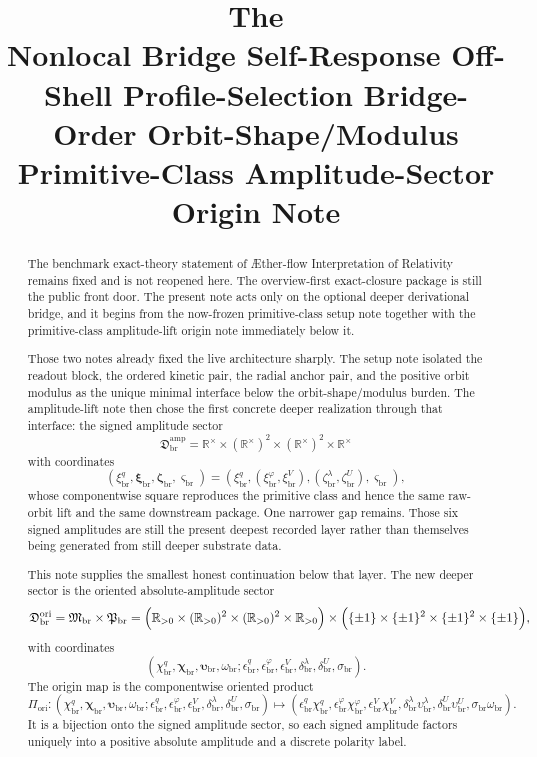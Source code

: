 \documentclass[11pt]{article}
\title{\textbf{The \TheoryName{}}\\[0.4em]
\large Nonlocal Bridge Self-Response Off-Shell Profile-Selection Bridge-Order Orbit-Shape/Modulus Primitive-Class Amplitude-Sector Origin Note}
\author{}
\date{}
\newcommand{\Aflow}{\AE{}ther-flow}
\newcommand{\TheoryName}{\Aflow{} Interpretation of Relativity}
\newcommand{\LiftSector}{\mathfrak D_{\mathrm{br}}^{\mathrm{amp}}}
\newcommand{\DeepReadAmp}{\xi_{\mathrm{br}}^{q}}
\newcommand{\DeepCovAmp}{\xi_{\mathrm{br}}^{\varphi}}
\newcommand{\DeepRelaxAmp}{\xi_{\mathrm{br}}^{V}}
\newcommand{\DeepKinAmp}{\bm\xi_{\mathrm{br}}}
\newcommand{\DeepWellAmp}{\zeta_{\mathrm{br}}^{\lambda}}
\newcommand{\DeepEqAmp}{\zeta_{\mathrm{br}}^{U}}
\newcommand{\DeepAnchorAmp}{\bm\zeta_{\mathrm{br}}}
\newcommand{\DeepScaleAmp}{\varsigma_{\mathrm{br}}}
\newcommand{\Rstar}{\mathbb R^{\times}}
\newcommand{\AbsAmpSector}{\mathfrak M_{\mathrm{br}}}
\newcommand{\PolaritySector}{\mathfrak P_{\mathrm{br}}}
\newcommand{\OriginSector}{\mathfrak D_{\mathrm{br}}^{\mathrm{ori}}}
\newcommand{\AbsReadAmp}{\chi_{\mathrm{br}}^{q}}
\newcommand{\AbsCovAmp}{\chi_{\mathrm{br}}^{\varphi}}
\newcommand{\AbsRelaxAmp}{\chi_{\mathrm{br}}^{V}}
\newcommand{\AbsKinAmp}{\bm\chi_{\mathrm{br}}}
\newcommand{\AbsWellAmp}{\upsilon_{\mathrm{br}}^{\lambda}}
\newcommand{\AbsEqAmp}{\upsilon_{\mathrm{br}}^{U}}
\newcommand{\AbsAnchorAmp}{\bm\upsilon_{\mathrm{br}}}
\newcommand{\AbsScaleAmp}{\omega_{\mathrm{br}}}
\newcommand{\PolRead}{\epsilon_{\mathrm{br}}^{q}}
\newcommand{\PolCov}{\epsilon_{\mathrm{br}}^{\varphi}}
\newcommand{\PolRelax}{\epsilon_{\mathrm{br}}^{V}}
\newcommand{\PolWell}{\delta_{\mathrm{br}}^{\lambda}}
\newcommand{\PolEq}{\delta_{\mathrm{br}}^{U}}
\newcommand{\PolScale}{\sigma_{\mathrm{br}}}
\newcommand{\OriginMap}{\Pi_{\mathrm{ori}}}
\begin{document}
\maketitle

\begin{abstract}
The benchmark exact-theory statement of \TheoryName{} remains fixed and is not reopened here. The overview-first exact-closure package is still the public front door. The present note acts only on the optional deeper derivational bridge, and it begins from the now-frozen primitive-class setup note together with the primitive-class amplitude-lift origin note immediately below it.

Those two notes already fixed the live architecture sharply. The setup note isolated the readout block, the ordered kinetic pair, the radial anchor pair, and the positive orbit modulus as the unique minimal interface below the orbit-shape/modulus burden. The amplitude-lift note then chose the first concrete deeper realization through that interface: the signed amplitude sector
\[
\LiftSector
=
\Rstar\times(\Rstar)^2\times(\Rstar)^2\times\Rstar
\]
with coordinates
\[
(\DeepReadAmp,\DeepKinAmp,\DeepAnchorAmp,\DeepScaleAmp)
=
(\DeepReadAmp,(\DeepCovAmp,\DeepRelaxAmp),(\DeepWellAmp,\DeepEqAmp),\DeepScaleAmp),
\]
whose componentwise square reproduces the primitive class and hence the same raw-orbit lift and the same downstream package. One narrower gap remains. Those six signed amplitudes are still the present deepest recorded layer rather than themselves being generated from still deeper substrate data.

This note supplies the smallest honest continuation below that layer. The new deeper sector is the oriented absolute-amplitude sector
\[
\OriginSector
=
\AbsAmpSector\times\PolaritySector
=
\Bigl(\mathbb R_{>0}\times(\mathbb R_{>0})^2\times(\mathbb R_{>0})^2\times\mathbb R_{>0}\Bigr)
\times
\Bigl(\{\pm1\}\times\{\pm1\}^2\times\{\pm1\}^2\times\{\pm1\}\Bigr),
\]
with coordinates
\[
(\AbsReadAmp,\AbsKinAmp,\AbsAnchorAmp,\AbsScaleAmp;\PolRead,\PolCov,\PolRelax,\PolWell,\PolEq,\PolScale).
\]
The origin map is the componentwise oriented product
\[
\OriginMap:
(\AbsReadAmp,\AbsKinAmp,\AbsAnchorAmp,\AbsScaleAmp;\PolRead,\PolCov,\PolRelax,\PolWell,\PolEq,\PolScale)
\longmapsto
(\PolRead\AbsReadAmp,\PolCov\AbsCovAmp,\PolRelax\AbsRelaxAmp,\PolWell\AbsWellAmp,\PolEq\AbsEqAmp,\PolScale\AbsScaleAmp).
\]
It is a bijection onto the signed amplitude sector, so each signed amplitude factors uniquely into a positive absolute amplitude and a discrete polarity label.


\end{abstract}
\end{document}
